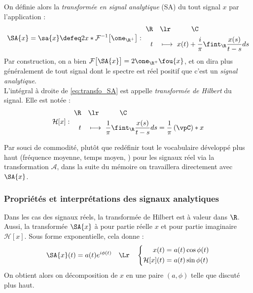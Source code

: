 \begin{definition}\label{def:transfo_sa&hilbert}
	On définie alors la \emph{transformée en signal analytique} (SA) du tout signal $x$ par l'application :
	\begin{equation}\label{eq:transfo_SA}
		\SA{x} = \sa{x} \defeq 2 x*\mathcal{F}^{-1}\big[\one_{\R^+}\big] :\ \begin{aligned} 
			\R \quad &\lr\qquad\quad \C \\	
			t\quad &\longmapsto\ x(t) + \frac{i}{\pi}\fint_\R \frac{x(s)}{t-s}ds
		\end{aligned}
	\end{equation}
	Par construction, on a bien $\mathcal{F}\big[\SA{x}\big] = 2\one_{\R^+}\fou{x}$, et on dira plus généralement de tout signal dont le spectre est réel positif que c'est un \emph{signal analytique}.
	\\
	L'intégral à droite de \eqref{eq:transfo_SA} est appelle \emph{transformée de Hilbert} du signal. Elle est notée :
	\begin{equation}\label{eq:transfo_Hilb}
		\mathcal{H}[x] :\ \begin{aligned} 
			\R \quad &\lr\qquad\quad \C \\	
			t\quad &\longmapsto\ \frac{1}{\pi}\fint_\R \frac{x(s)}{t-s}ds =  \frac{1}{\pi}\left(\vpC\right)*x
		\end{aligned}
	\end{equation}
\end{definition}

Par souci de commodité, plutôt que redéfinir tout le vocabulaire développé plus haut (fréquence moyenne, temps moyen, \etc) pour les signaux réel via la transformation $\mathcal{A}$, dans la suite du mémoire on travaillera directement avec $\SA{x}$. %




\subsubsection{Propriétés et interprétations des signaux analytiques}\label{subsec:Bedrisan&AM-FM}


Dans les cas des signaux réels, la transformée de Hilbert est à valeur dans $\R$. Aussi, la transformée $\SA{x}$ à pour partie réelle $x$ et pour partie imaginaire $\mathcal{H}[x]$. Sous forme exponentielle, cela donne :
\[\SA{x}(t) = a(t)e^{i\phi(t)}\quad \Lr\quad \left\{\begin{aligned}x(t) &= a(t) \cos\phi(t) \\\mathcal{H}[x](t) &= a(t) \sin\phi(t)
\end{aligned}\right.\]
On obtient alors on décomposition de $x$ en une paire $(a,\phi)$ telle que discuté plus haut.

